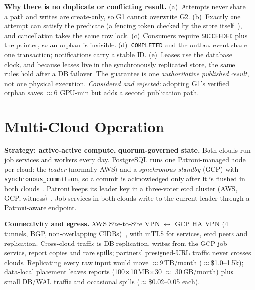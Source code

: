 \documentclass[10pt,a4paper]{article}
\begin{document}
\textbf{Why there is no duplicate or conflicting result.} (a)~Attempts never share a path and writes are
create-only, so G1 cannot overwrite G2. (b)~Exactly one attempt can satisfy the predicate (a fencing token
checked by the store itself~\cite{kleppmann-lock,ddia}), and cancellation takes the same row lock. (c)~Consumers
require \texttt{SUCCEEDED} plus the pointer, so an orphan is invisible. (d)~\texttt{COMPLETED} and the outbox
event share one transaction; notifications carry a stable ID. (e)~Leases use the database clock, and
because leases live in the synchronously replicated store, the same rules hold after a DB failover. The
guarantee is one \emph{authoritative published result}, not one physical execution. \emph{Considered and
rejected:} adopting G1's verified orphan saves $\approx$6 GPU-min but adds a second publication path.

\section{Multi-Cloud Operation}\label{sec:mc}
\textbf{Strategy: active-active compute, quorum-governed state.} Both clouds run job services and workers
every day. PostgreSQL runs one Patroni-managed node per cloud: the \emph{leader} (normally AWS) and a
\emph{synchronous standby} (GCP) with \texttt{synchronous\_commit=on}, so a commit is acknowledged only after
it is flushed in both clouds~\cite{pg-syncrep}. Patroni keeps its leader key in a three-voter etcd cluster
(AWS, GCP, witness)~\cite{patroni-sync}. Job services in both clouds write to the current leader through a
Patroni-aware endpoint.

\textbf{Connectivity and egress.} AWS Site-to-Site VPN $\leftrightarrow$ GCP HA VPN (4 tunnels, BGP,
non-overlapping CIDRs)~\cite{gcp-havpn}, with mTLS for services, etcd peers and replication. Cross-cloud traffic
is DB replication, writes from the GCP job service, report copies and rare spills; partners'
presigned-URL traffic never crosses clouds. Replicating every raw input would move $\approx$9\,TB/month
($\approx$\$1.0--1.5k); data-local placement leaves reports (100$\times$10\,MB$\times$30 $\approx$
30\,GB/month) plus small DB/WAL traffic and occasional spills ($\approx$\$0.02--0.05 each).
\end{document}
